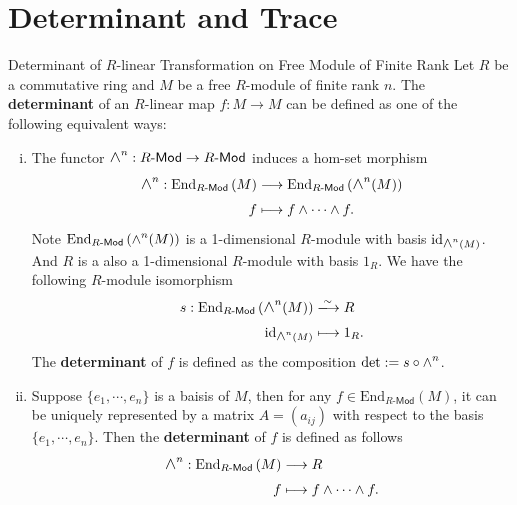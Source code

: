 \section{Determinant and Trace}



\begin{definition}{Determinant of $R$-linear Transformation on Free Module of Finite Rank}{}
    Let $R$ be a commutative ring and $M$ be a free $R$-module of finite rank $n$. The \textbf{determinant} of an $R$-linear map $f:M\to M$ can be defined as one of the following equivalent ways:
    \begin{enumerate}[(i)]
        \item The functor $\Largewedge^n:R\text{-}\mathsf{Mod}\to R\text{-}\mathsf{Mod}$ induces a hom-set morphism 
        \begin{align*}
            \largewedge^n:\mathrm{End}_{R\text{-}\mathsf{Mod}}\left(M\right) &\longrightarrow\mathrm{End}_{R\text{-}\mathsf{Mod}}\left(\largewedge^n(M)\right)\\
        f &\longmapsto f\wedge\cdots\wedge f.
        \end{align*}
        Note $\mathrm{End}_{R\text{-}\mathsf{Mod}}\left(\largewedge^n(M)\right)$ is a 1-dimensional $R$-module with basis $\mathrm{id}_{\largewedge^n(M)}$. And $R$ is a also a 1-dimensional $R$-module with basis $1_R$. We have the following $R$-module isomorphism
        \begin{align*}
            s:\mathrm{End}_{R\text{-}\mathsf{Mod}}\left(\largewedge^n(M)\right)&\xlongrightarrow{\sim} R\\
            \mathrm{id}_{\largewedge^n(M)} &\longmapsto 1_R.
        \end{align*}
        The \textbf{determinant} of $f$ is defined as the composition $\det:=s\circ \largewedge^n$.
        \item Suppose $\{e_1,\cdots,e_n\}$ is a baisis of $M$, then for any $f\in \mathrm{End}_{R\text{-}\mathsf{Mod}}\left(M\right)$, it can be uniquely represented by a matrix $A=(a_{ij})$ with respect to the basis $\{e_1,\cdots,e_n\}$. Then the \textbf{determinant} of $f$ is defined as follows
        \begin{align*}
            \largewedge^n:\mathrm{End}_{R\text{-}\mathsf{Mod}}\left(M\right) &\longrightarrow R\\
        f &\longmapsto f\wedge\cdots\wedge f.
        \end{align*}
    \end{enumerate}
\end{definition}

